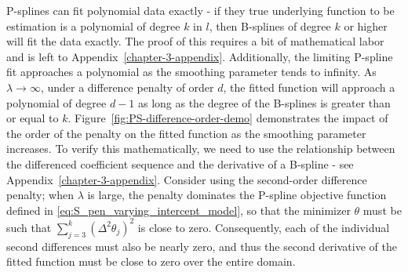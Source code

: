 P-splines can fit polynomial data exactly - if they true underlying function to be estimation is a polynomial of degree $k$ in $l$, then B-splines of degree $k$ or higher will fit the data exactly. The proof of this requires a bit of mathematical labor and is left to Appendix~\ref{chapter-3-appendix}. Additionally, the limiting P-spline fit approaches a polynomial as the smoothing parameter tends to infinity.  As $\lambda \rightarrow \infty$, under a difference penalty of order $d$, the fitted function will approach a polynomial of degree $d-1$ as long as the degree of the B-splines is greater than or equal to $k$. Figure~\ref{fig:PS-difference-order-demo} demonstrates the impact of the order of the penalty on the fitted function as the smoothing parameter increases. To verify this mathematically, we need to use the relationship between the differenced coefficient sequence and the derivative of a B-spline - see Appendix~\ref{chapter-3-appendix}. Consider using the second-order difference penalty; when $\lambda$ is large, the penalty dominates the P-spline objective function defined in \ref{eq:S_pen_varying_intercept_model}, so that the minimizer $\theta$ must be such that $\sum_{j=3}^k\left(\Delta^2\theta_j\right)^2$ is close to zero. Consequently, each of the individual second differences must also be nearly zero, and thus the second derivative of the fitted function must be close to zero over the entire domain.

